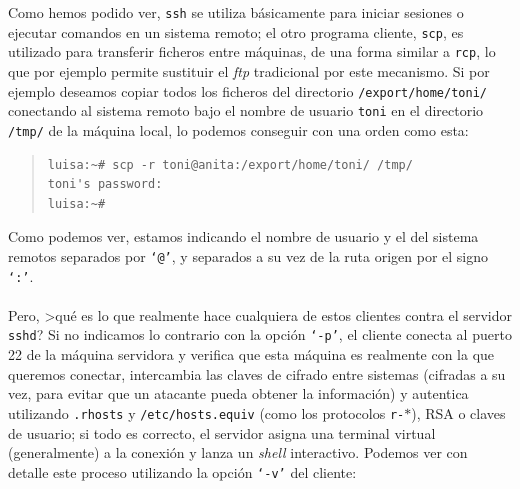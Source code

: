 Como hemos podido ver, {\tt ssh} se utiliza b\'asicamente para iniciar sesiones
o ejecutar comandos en un sistema remoto; el otro programa cliente, {\tt scp},
es utilizado para transferir ficheros entre m\'aquinas, de una forma similar
a {\tt rcp}, lo que por ejemplo permite sustituir el {\it ftp} tradicional por
este mecanismo. Si por ejemplo deseamos copiar todos los ficheros del 
directorio {\tt /export/home/toni/} conectando al sistema remoto bajo el nombre
de usuario {\tt toni} en el directorio {\tt /tmp/} de la m\'aquina local, lo 
podemos conseguir con una orden como esta:
\begin{quote}
\begin{verbatim}
luisa:~# scp -r toni@anita:/export/home/toni/ /tmp/
toni's password:
luisa:~#
\end{verbatim}
\end{quote}
Como podemos ver, estamos indicando el nombre de usuario y el del sistema
remotos separados por {\tt `@'}, y separados a su vez de la ruta origen por
el signo {\tt `:'}.\\ 
\\Pero, >qu\'e es lo que realmente hace cualquiera de estos clientes contra el
servidor {\tt sshd}? Si no indicamos lo contrario con la opci\'on {\tt `-p'}, 
el cliente 
conecta al puerto 22 de la m\'aquina servidora y verifica que esta m\'aquina
es realmente con la que queremos conectar, intercambia las claves de cifrado
entre sistemas (cifradas a su vez, para evitar que un atacante pueda obtener
la informaci\'on) y autentica utilizando {\tt .rhosts} y {\tt /etc/hosts.equiv}
(como los protocolos {\tt r-$\ast$}), RSA o claves de usuario; si todo es 
correcto, el servidor asigna una terminal virtual (generalmente) a la conexi\'on
y lanza un {\it shell} interactivo. Podemos ver con detalle este proceso
utilizando la opci\'on {\tt `-v'} del cliente:
